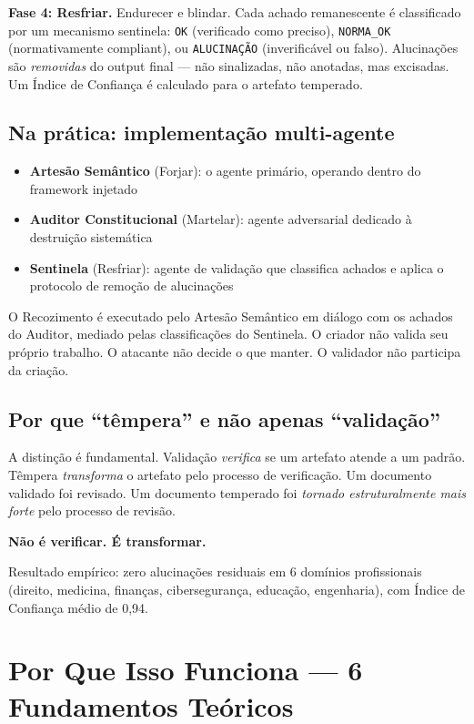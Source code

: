 \documentclass[12pt,a4paper]{article}
\begin{document}
\textbf{Fase 4: Resfriar.} Endurecer e blindar. Cada achado remanescente é classificado por um mecanismo sentinela: \texttt{OK} (verificado como preciso), \texttt{NORMA\_OK} (normativamente compliant), ou \texttt{ALUCINAÇÃO} (inverificável ou falso). Alucinações são \emph{removidas} do output final --- não sinalizadas, não anotadas, mas excisadas. Um Índice de Confiança é calculado para o artefato temperado.

\subsection{Na prática: implementação multi-agente}

\begin{itemize}
  \item \textbf{Artesão Semântico} (Forjar): o agente primário, operando dentro do framework injetado
  \item \textbf{Auditor Constitucional} (Martelar): agente adversarial dedicado à destruição sistemática
  \item \textbf{Sentinela} (Resfriar): agente de validação que classifica achados e aplica o protocolo de remoção de alucinações
\end{itemize}

O Recozimento é executado pelo Artesão Semântico em diálogo com os achados do Auditor, mediado pelas classificações do Sentinela. O criador não valida seu próprio trabalho. O atacante não decide o que manter. O validador não participa da criação.

\subsection{Por que ``têmpera'' e não apenas ``validação''}

A distinção é fundamental. Validação \emph{verifica} se um artefato atende a um padrão. Têmpera \emph{transforma} o artefato pelo processo de verificação. Um documento validado foi revisado. Um documento temperado foi \emph{tornado estruturalmente mais forte} pelo processo de revisão.

\textbf{Não é verificar. É transformar.}

Resultado empírico: zero alucinações residuais em 6 domínios profissionais (direito, medicina, finanças, cibersegurança, educação, engenharia), com Índice de Confiança médio de 0,94.

\section{Por Que Isso Funciona --- 6 Fundamentos Teóricos}
\label{sec:fundamentos}
\end{document}
